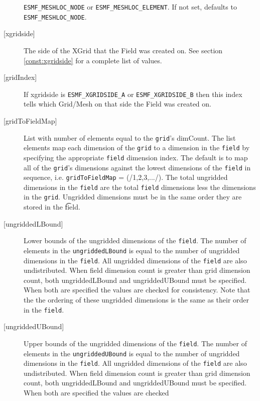 \begin{description}
\begin{sloppypar}
   {\tt ESMF\_MESHLOC\_NODE} or {\tt ESMF\_MESHLOC\_ELEMENT}. If not set,
   defaults to {\tt ESMF\_MESHLOC\_NODE}.
   \end{sloppypar}
   \item [{[xgridside]}]
   \begin{sloppypar}
   \apiStatusCompatibleException
   The side of the XGrid that the Field was created on. See section
   \ref{const:xgridside} for a complete list of values.
   \end{sloppypar}
   \item [{[gridIndex]}]
   \apiStatusCompatibleException
   If xgridside is {\tt ESMF\_XGRIDSIDE\_A} or {\tt ESMF\_XGRIDSIDE\_B}
   then this index tells which Grid/Mesh on that side the Field was
   created on.
   \item [{[gridToFieldMap]}]
   List with number of elements equal to the
   {\tt grid}'s dimCount. The list elements map each dimension
   of the {\tt grid} to a dimension in the {\tt field} by
   specifying the appropriate {\tt field} dimension index. The default is to
   map all of the {\tt grid}'s dimensions against the lowest dimensions of
   the {\tt field} in sequence, i.e. {\tt gridToFieldMap} = (/1,2,3,.../).
   The total ungridded dimensions in the {\tt field}
   are the total {\tt field} dimensions less
   the dimensions in
   the {\tt grid}. Ungridded dimensions must be in the same order they are
   stored in the {\t field}.
   \item [{[ungriddedLBound]}]
   Lower bounds of the ungridded dimensions of the {\tt field}.
   The number of elements in the {\tt ungriddedLBound} is equal to the number of ungridded
   dimensions in the {\tt field}. All ungridded dimensions of the
   {\tt field} are also undistributed. When field dimension count is
   greater than grid dimension count, both ungriddedLBound and ungriddedUBound
   must be specified. When both are specified the values are checked
   for consistency. Note that the the ordering of
   these ungridded dimensions is the same as their order in the {\tt field}.
   \item [{[ungriddedUBound]}]
   Upper bounds of the ungridded dimensions of the {\tt field}.
   The number of elements in the {\tt ungriddedUBound} is equal to the number of ungridded
   dimensions in the {\tt field}. All ungridded dimensions of the
   {\tt field} are also undistributed. When field dimension count is
   greater than grid dimension count, both ungriddedLBound and ungriddedUBound
   must be specified. When both are specified the values are checked

\end{description}
